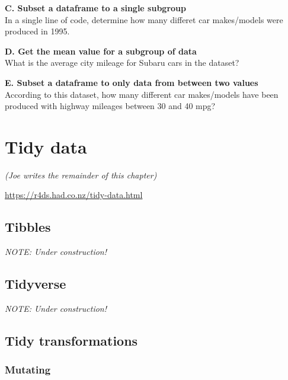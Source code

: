 \documentclass[
]{book}
\begin{document}
\textbf{C. Subset a dataframe to a single subgroup}\\
In a single line of code, determine how many differet car makes/models were produced in 1995.

\textbf{D. Get the mean value for a subgroup of data}\\
What is the average city mileage for Subaru cars in the dataset?

\textbf{E. Subset a dataframe to only data from between two values}\\
According to this dataset, how many different car makes/models have been produced with highway mileages between 30 and 40 mpg?

\hypertarget{tidy-data}{%
\section*{Tidy data}\label{tidy-data}}

\emph{(Joe writes the remainder of this chapter)}

\url{https://r4ds.had.co.nz/tidy-data.html}

\hypertarget{tibbles}{%
\subsection*{Tibbles}\label{tibbles}}

\emph{NOTE: Under construction!}

\hypertarget{tidyverse}{%
\subsection*{Tidyverse}\label{tidyverse}}

\emph{NOTE: Under construction!}

\hypertarget{tidy-transformations}{%
\subsection*{Tidy transformations}\label{tidy-transformations}}

\hypertarget{mutating}{%
\subsubsection*{Mutating}\label{mutating}}
\end{document}
